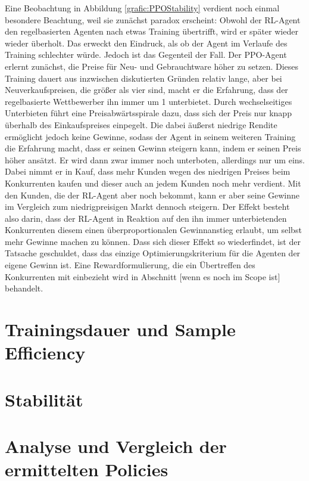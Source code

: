 Eine Beobachtung in Abbildung \ref{grafic:PPOStability} verdient noch einmal besondere Beachtung, weil sie zunächst paradox erscheint:
Obwohl der RL-Agent den regelbasierten Agenten nach etwas Training übertrifft, wird er später wieder wieder überholt.
Das erweckt den Eindruck, als ob der Agent im Verlaufe des Training schlechter würde.
Jedoch ist das Gegenteil der Fall.
Der PPO-Agent erlernt zunächst, die Preise für Neu- und Gebrauchtware höher zu setzen.
Dieses Training dauert aus inzwischen diskutierten Gründen relativ lange, aber bei Neuverkaufspreisen, die größer als vier sind, macht er die Erfahrung, dass der regelbasierte Wettbewerber ihn immer um 1 unterbietet.
Durch wechselseitiges Unterbieten führt eine Preisabwärtsspirale dazu, dass sich der Preis nur knapp überhalb des Einkaufspreises einpegelt.
Die dabei äußerst niedrige Rendite ermöglicht jedoch keine Gewinne, sodass der Agent in seinem weiteren Training die Erfahrung macht, dass er seinen Gewinn steigern kann, indem er seinen Preis höher ansätzt.
Er wird dann zwar immer noch unterboten, allerdings nur um eins.
Dabei nimmt er in Kauf, dass mehr Kunden wegen des niedrigen Preises beim Konkurrenten kaufen und dieser auch an jedem Kunden noch mehr verdient.
Mit den Kunden, die der RL-Agent aber noch bekommt, kann er aber seine Gewinne im Vergleich zum niedrigpreisigen Markt dennoch steigern.
Der Effekt besteht also darin, dass der RL-Agent in Reaktion auf den ihn immer unterbietenden Konkurrenten diesem einen überproportionalen Gewinnanstieg erlaubt, um selbst mehr Gewinne machen zu können.
Dass sich dieser Effekt so wiederfindet, ist der Tatsache geschuldet, dass das einzige Optimierungskriterium für die Agenten der eigene Gewinn ist.
Eine Rewardformulierung, die ein Übertreffen des Konkurrenten mit einbezieht wird in Abschnitt [wenn es noch im Scope ist] behandelt.

\section{Trainingsdauer und Sample Efficiency}

\section{Stabilität}

\section{Analyse und Vergleich der ermittelten Policies}
